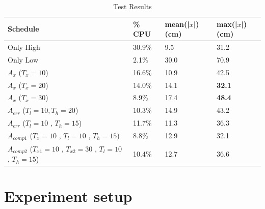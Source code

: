 \documentclass{sig-alternate-ipsn13}
\begin{document}
\begin{table}[htbp]
    \caption{Test Results}
    \begin{center}
        \begin{tabular}{m{8em} |  m{4em} m{5em} m{5em}}
            \hline
            \textbf{Schedule}& \textbf{\% CPU}  & \textbf{mean(|$x$|) (cm)} & \textbf{max(|$x$|) (cm)}\\
            \hline
            Only High & 30.9\% & 9.5 & 31.2 \\
            \hline
            Only Low & 2.1\% & 30.0 & 70.9 \\
            \hline
            $A_{x}$ \newline ($T_x=10$) & 16.6\% & 10.9 & 42.5 \\
            \hline
            $A_{x}$ \newline ($T_x=20$)  & 14.0\% & 14.1 & \textbf{32.1} \\
            \hline
            $A_{x}$ \newline ($T_x=30$)  & 8.9\% & 17.4 & \textbf{48.4} \\
            \hline
            $A_{err}$ \newline ($T_l=10 , T_h=20$) & 10.3\% & 14.9 & 43.2 \\
            \hline
            $A_{err}$ \newline ($T_l=10$ , $T_h=15$) & 11.7\% & 11.3 & 36.3 \\
            \hline
            $A_{comp1}$ \newline ($T_x=10$ , $T_l=10$ , $T_h=15$)  & 8.8\% & 12.9 & 32.1 \\
            \hline
            $A_{comp2}$ \newline ($T_{x1}=10$ , $T_{x2}=30$ , $T_l=10$ , $T_h=15$)   & 10.4\% & 12.7 & 36.6 \\
            \hline
            
        \end{tabular}
        \label{tab:results}
    \end{center}
\end{table}

\section{Experiment setup}
\label{sec:Experiment setup}
\end{document}
